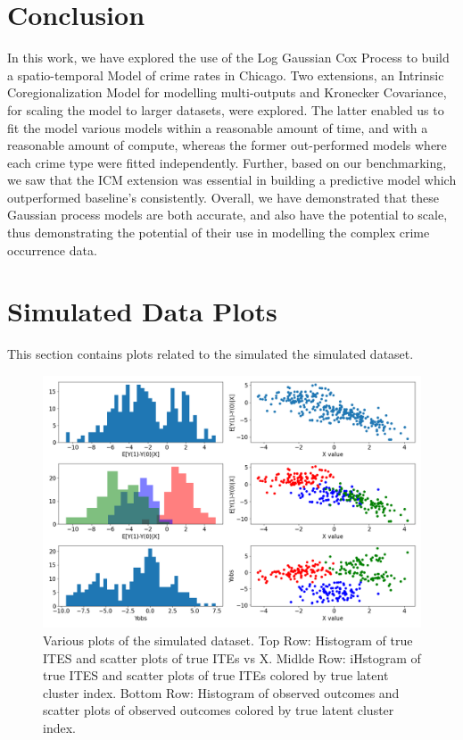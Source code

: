 \documentclass{article}
\begin{document}
\section{Conclusion}
In this work, we have explored the use of the Log Gaussian Cox Process to build a spatio-temporal Model of crime rates in Chicago. Two extensions, an Intrinsic Coregionalization Model for modelling multi-outputs and Kronecker Covariance, for scaling the model to larger datasets, were explored. The latter enabled us to fit the model various models within a reasonable amount of time, and with a reasonable amount of compute, whereas the former out-performed models where each crime type were fitted independently. Further, based on our benchmarking, we saw that the ICM extension was essential in building a predictive model which outperformed baseline's consistently. Overall, we have demonstrated that these Gaussian process models are both accurate, and also have the potential to scale, thus demonstrating the potential of their use in modelling the complex crime occurrence data. 




\appendix

\section{Simulated Data Plots}
This section contains plots related to the simulated the simulated dataset.
\begin{figure}[h]
  \centering
  \includegraphics[width=1\textwidth]{Plots/simulated_data_info.png}
  \caption{Various plots of the simulated dataset. Top Row: Histogram of true ITES and scatter plots of true ITEs vs X. Midlde Row: iHstogram of true ITES and scatter plots of true ITEs colored by true latent cluster index. Bottom Row: Histogram of observed outcomes and scatter plots of observed outcomes colored by true latent cluster index.}
  \label{fig:sim_data_info}
\end{figure}
\end{document}
